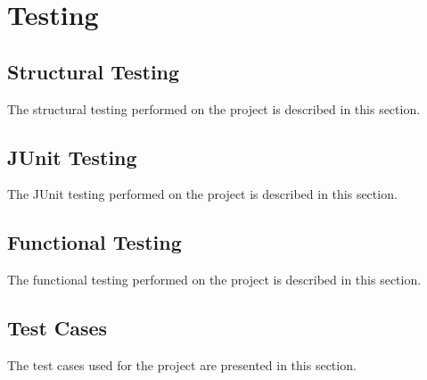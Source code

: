 \chapter{Testing}\label{ch:testing}


\section{Structural Testing}\label{sec:structural-testing}

The structural testing performed on the project is described in this section.

\section{JUnit Testing}\label{sec:junit-testing}

The JUnit testing performed on the project is described in this section.

\section{Functional Testing}\label{sec:functional-testing}

The functional testing performed on the project is described in this section.

\section{Test Cases}\label{sec:test-cases}

The test cases used for the project are presented in this section.

